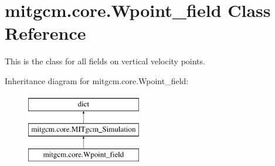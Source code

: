 \hypertarget{classmitgcm_1_1core_1_1Wpoint__field}{}\section{mitgcm.\+core.\+Wpoint\+\_\+field Class Reference}
\label{classmitgcm_1_1core_1_1Wpoint__field}


This is the class for all fields on vertical velocity points.  


Inheritance diagram for mitgcm.\+core.\+Wpoint\+\_\+field\+:\begin{figure}[H]
\begin{center}
\leavevmode
\includegraphics[height=3.000000cm]{classmitgcm_1_1core_1_1Wpoint__field}
\end{center}
\end{figure}
